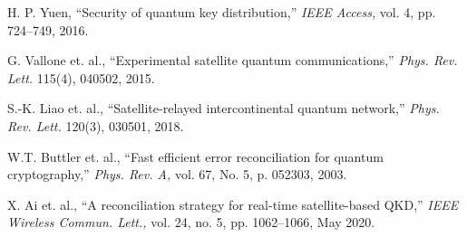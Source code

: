 \documentclass[12pt,onecolumn,letterpaper]{IEEEtran}
\begin{document}
\begin{thebibliography}{99}
H. P. Yuen, 
\enquote{Security of quantum key distribution,}
\emph{IEEE Access,} vol. 4, pp. 724--749, 2016.

G. Vallone et. al., 
\enquote{Experimental satellite quantum communications,}
\emph{Phys. Rev. Lett.} 115(4), 040502, 2015.

S.-K. Liao et. al., 
\enquote{Satellite-relayed intercontinental quantum network,}
\emph{Phys. Rev. Lett.} 120(3), 030501, 2018.

W.T. Buttler et. al., 
\enquote{Fast efficient error reconciliation for quantum cryptography,}
\emph{Phys. Rev. A,} vol. 67, No. 5, p. 052303, 2003.

X. Ai et. al., 
\enquote{A reconciliation strategy for real-time satellite-based QKD,} 
\emph{IEEE Wireless Commun. Lett.,} vol. 24, no. 5, pp. 1062--1066, May 2020. 

\end{thebibliography}
\end{document}
